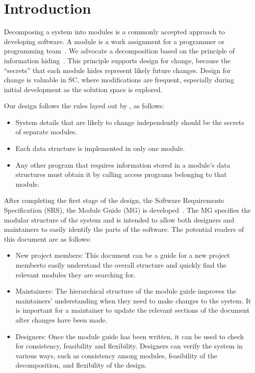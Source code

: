 \documentclass[12pt, titlepage]{article}
\begin{document}
\newpage

\tableofcontents

\listoftables

\listoffigures

\newpage


\section{Introduction}

Decomposing a system into modules is a commonly accepted approach to developing
software.  A module is a work assignment for a programmer or programming
team~\citep{ParnasEtAl1984}.  We advocate a decomposition
based on the principle of information hiding~\citep{Parnas1972a}.  This
principle supports design for change, because the ``secrets'' that each module
hides represent likely future changes.  Design for change is valuable in SC,
where modifications are frequent, especially during initial development as the
solution space is explored.  

Our design follows the rules layed out by \citet{ParnasEtAl1984}, as follows:
\begin{itemize}
\item System details that are likely to change independently should be the
  secrets of separate modules.
\item Each data structure is implemented in only one module.
\item Any other program that requires information stored in a module's data
structures must obtain it by calling access programs belonging to that
module.\end{itemize}

After completing the first stage of the design, the Software Requirements
Specification (SRS), the Module Guide (MG) is developed~\citep{ParnasEtAl1984}.
The MG
specifies the modular structure of the system and is intended to allow both
designers and maintainers to easily identify the parts of the software.  The
potential readers of this document are as follows:

\begin{itemize}
\item New project members: This document can be a guide for a new project
memberto easily understand the overall structure and quickly find the
  relevant modules they are searching for.
\item Maintainers: The hierarchical structure of the module guide improves the
maintainers' understanding when they need to make changes to the system. It is
important for a maintainer to update the relevant sections of the document
  after changes have been made.
\item Designers: Once the module guide has been written, it can be used to
  check for consistency, feasibility and flexibility. Designers can verify the
  system in various ways, such as consistency among modules, feasibility of the
  decomposition, and flexibility of the design.
\end{itemize}
\end{document}
